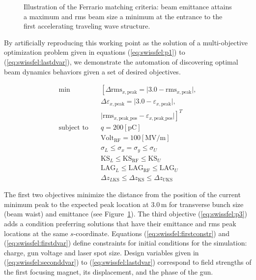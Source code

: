 \begin{figure}
  \centering
  
  \caption{Illustration of the Ferrario matching criteria: beam emittance
  attains a maximum and rms beam size a minimum at the entrance to the first
  accelerating traveling wave structure.}
  \label{fig:fer_match}
\end{figure}

By artificially reproducing this working point as the solution of a
  multi-objective optimization problem given in equations
  (\ref{eq:swissfel:p1}) to (\ref{eq:swissfel:lastdvar}),
  we demonstrate the automation of discovering optimal beam dynamics behaviors
  given a set of desired objectives.

\begin{align}
\text{min}  \quad & \left[ \Delta \text{rms}_{x,\text{peak}} = \vert 3.0 -
\text{rms}_{x,\text{peak}} \vert, \right. \label{eq:swissfel:p1}\\
                & \Delta \varepsilon_{x,\text{peak}}  = \vert 3.0 -
                \varepsilon_{x,\text{peak}} \vert, \label{eq:swissfel:p2}\\
                & \left. \vert \text{rms}_{x, \text{peak\_pos}} -
                \varepsilon_{x,\text{peak\_pos}} \vert
                \label{eq:swissfel:p3} \right]^T\\
\text{subject to} \quad & q = 200 \left[\text{pC}\right] \label{eq:swissfel:firstconstr}\\
          \quad & \text{Volt}_{\text{RF}} = 100 \left[\text{MV/m}\right] \label{eq:swissfel:lastconstr}\\
          \quad & \sigma_{L} \leq \sigma_x = \sigma_y \leq \sigma_{U} \label{eq:swissfel:firstdvar}\\
          \quad & \text{KS}_{L} \leq \text{KS}_{\text{RF}} \leq \text{KS}_{U} \label{eq:swissfel:seconddvar}\\
          \quad & \text{LAG}_{L} \leq \text{LAG}_{\text{RF}} \leq \text{LAG}_{U} \\
          \quad & \Delta z_{L\text{KS}} \leq \Delta z_{\text{KS}} \leq \Delta z_{U\text{KS}} \label{eq:swissfel:lastdvar}
\end{align}

The first two objectives minimize the distance from the position of the current
  minimum peak to the expected peak location at $3.0$\,m for transverse bunch
  size (beam waist) and emittance (see Figure~\ref{fig:fer_match}).
The third objective (\ref{eq:swissfel:p3}) adds a condition preferring
  solutions that have their emittance and rms peak locations at the same
  $s$-coordinate.
Equations (\ref{eq:swissfel:firstconstr}) and (\ref{eq:swissfel:firstdvar})
  define constraints for initial conditions for the simulation: charge,
  gun voltage and laser spot size.
Design variables given in (\ref{eq:swissfel:seconddvar}) to
  (\ref{eq:swissfel:lastdvar}) correspond to field strengths of the
  first focusing magnet, its displacement, and the phase of the gun.

